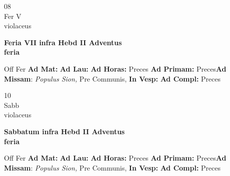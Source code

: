 \documentclass[10pt, openany]{book}
\begin{document}
    \begin{center}
        \begin{minipage}{3.5in}
            \vspace{2em}
            \begin{minipage}{0.5in}
                {\Huge 08} \\
                {\normalsize Fer V} \\
                {\normalsize violaceus}
            \end{minipage}
            \begin{minipage}{3.0in}
                \textbf{ \large Feria VII infra Hebd II Adventus \\
                \textnormal{\normalsize feria}} \\ 
            \end{minipage}
            \begin{justify}Off Fer
                \textbf{Ad Mat: }
                \textbf{Ad Lau: }
                \textbf{Ad Horas: }Preces
                \textbf{Ad Primam: }Preces\textbf{Ad Missam}: \textit{Populus Sion,} Pre Communis,  
                \textbf{In Vesp: }
                \textbf{Ad Compl: }Preces
            \end{justify}
        \end{minipage}
    \end{center}

    \begin{center}
        \begin{minipage}{3.5in}
            \vspace{2em}
            \begin{minipage}{0.5in}
                {\Huge 10} \\
                {\normalsize Sabb} \\
                {\normalsize violaceus}
            \end{minipage}
            \begin{minipage}{3.0in}
                \textbf{ \large Sabbatum infra Hebd II Adventus \\
                \textnormal{\normalsize feria}} \\ 
            \end{minipage}
            \begin{justify}Off Fer
                \textbf{Ad Mat: }
                \textbf{Ad Lau: }
                \textbf{Ad Horas: }Preces
                \textbf{Ad Primam: }Preces\textbf{Ad Missam}: \textit{Populus Sion,} Pre Communis,  
                \textbf{In Vesp: }
                \textbf{Ad Compl: }Preces
            \end{justify}
        \end{minipage}
    \end{center}
\end{document}
